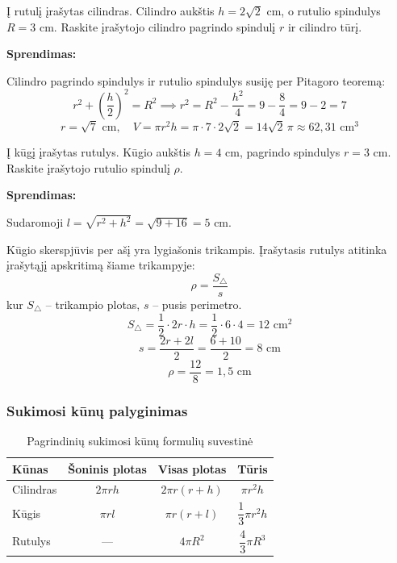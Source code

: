 \begin{exercise}
Į rutulį įrašytas cilindras. Cilindro aukštis $h = 2\sqrt{2}$ cm, o rutulio spindulys $R = 3$ cm. Raskite įrašytojo cilindro pagrindo spindulį $r$ ir cilindro tūrį.

\textbf{Sprendimas:}

Cilindro pagrindo spindulys ir rutulio spindulys susiję per Pitagoro teoremą:
\[
    r^2 + \left(\frac{h}{2}\right)^2 = R^2 \implies r^2 = R^2 - \frac{h^2}{4} = 9 - \frac{8}{4} = 9 - 2 = 7
\]
\[
    r = \sqrt{7} \text{ cm}, \quad V = \pi r^2 h = \pi \cdot 7 \cdot 2\sqrt{2} = 14\sqrt{2}\,\pi \approx 62{,}31 \text{ cm}^3
\]
\end{exercise}

\begin{exercise}
Į kūgį įrašytas rutulys. Kūgio aukštis $h = 4$ cm, pagrindo spindulys $r = 3$ cm. Raskite įrašytojo rutulio spindulį $\rho$.

\textbf{Sprendimas:}

Sudaromoji $l = \sqrt{r^2 + h^2} = \sqrt{9 + 16} = 5$ cm.

Kūgio skerspjūvis per ašį yra lygiašonis trikampis. Įrašytasis rutulys atitinka įrašytąjį apskritimą šiame trikampyje:
\[
    \rho = \frac{S_{\triangle}}{s}
\]
kur $S_{\triangle}$ – trikampio plotas, $s$ – pusis perimetro.
\[
    S_{\triangle} = \frac{1}{2} \cdot 2r \cdot h = \frac{1}{2} \cdot 6 \cdot 4 = 12 \text{ cm}^2
\]
\[
    s = \frac{2r + 2l}{2} = \frac{6 + 10}{2} = 8 \text{ cm}
\]
\[
    \rho = \frac{12}{8} = 1{,}5 \text{ cm}
\]
\end{exercise}

\subsubsection*{Sukimosi kūnų palyginimas}

\begin{table}[h]
\centering
\caption{Pagrindinių sukimosi kūnų formulių suvestinė}
\begin{tabular}{|l|c|c|c|}
\hline
\textbf{Kūnas} & \textbf{Šoninis plotas} & \textbf{Visas plotas} & \textbf{Tūris} \\
\hline
Cilindras & $2\pi r h$ & $2\pi r(r+h)$ & $\pi r^2 h$ \\
\hline
Kūgis & $\pi r l$ & $\pi r(r+l)$ & $\dfrac{1}{3}\pi r^2 h$ \\
\hline
Rutulys & — & $4\pi R^2$ & $\dfrac{4}{3}\pi R^3$ \\
\hline
\end{tabular}
\end{table}

